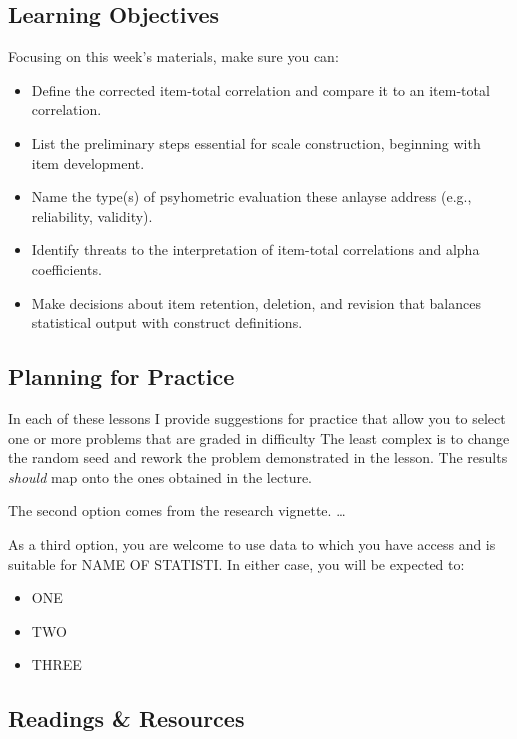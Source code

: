 \documentclass[
  english,
]{book}
\providecommand{\tightlist}{%
  \setlength{\itemsep}{0pt}\setlength{\parskip}{0pt}}
\begin{document}
\hypertarget{learning-objectives-3}{%
\subsection{Learning Objectives}\label{learning-objectives-3}}

Focusing on this week's materials, make sure you can:

\begin{itemize}
\tightlist
\item
  Define the corrected item-total correlation and compare it to an item-total correlation.
\item
  List the preliminary steps essential for scale construction, beginning with item development.
\item
  Name the type(s) of psyhometric evaluation these anlayse address (e.g., reliability, validity).
\item
  Identify threats to the interpretation of item-total correlations and alpha coefficients.
\item
  Make decisions about item retention, deletion, and revision that balances statistical output with construct definitions.
\end{itemize}

\hypertarget{planning-for-practice-3}{%
\subsection{Planning for Practice}\label{planning-for-practice-3}}

In each of these lessons I provide suggestions for practice that allow you to select one or more problems that are graded in difficulty The least complex is to change the random seed and rework the problem demonstrated in the lesson. The results \emph{should} map onto the ones obtained in the lecture.

The second option comes from the research vignette. \ldots{}

As a third option, you are welcome to use data to which you have access and is suitable for NAME OF STATISTI. In either case, you will be expected to:

\begin{itemize}
\tightlist
\item
  ONE
\item
  TWO
\item
  THREE
\end{itemize}

\hypertarget{readings-resources-3}{%
\subsection{Readings \& Resources}\label{readings-resources-3}}
\end{document}
